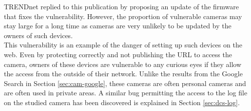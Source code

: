 TRENDnet replied to this publication by proposing an update of the firmware that fixes the vulnerability.
However, the proportion of vulnerable cameras may stay large for a long time as cameras are very unlikely to be updated by the owners of such devices.\\

This vulnerability is an example of the danger of setting up such devices on the web.
Even by protecting correctly and not publishing the URL to access the camera, owners of these devices are vulnerable to any curious eyes if they allow the access from the outside of their network.
Unlike the results from the Google Search in Section \ref{sec:cam-google}, these cameras are often personal cameras and are often used in private areas.
A similar bug permitting the access to the log file on the studied camera has been discovered is explained in Section \ref{sec:dcs-log}.